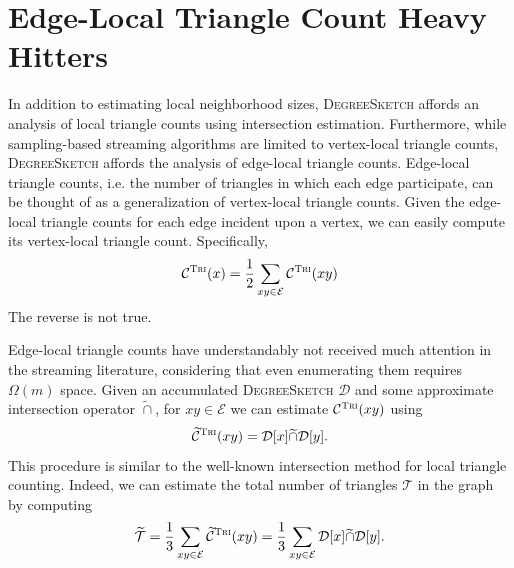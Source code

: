 \documentclass[10]{article}
\newcommand{\algoname}[1]{\textnormal{\textsc{#1}}}
\begin{document}
\section{Edge-Local Triangle Count Heavy Hitters}
 \label{DS:sec:edge_triangles}

In addition to estimating local neighborhood sizes, \algoname{DegreeSketch} affords an analysis of local triangle counts using intersection estimation. 
Furthermore, while sampling-based streaming algorithms are limited to vertex-local triangle counts, \algoname{DegreeSketch} affords the analysis of edge-local triangle counts. 
Edge-local triangle counts, i.e. the number of triangles in which each edge participate, can be thought of as a generalization of vertex-local triangle counts. 
Given the edge-local triangle counts for each edge incident upon a vertex, we can easily compute its vertex-local triangle count.
Specifically,
%
\begin{equation} \label{eq:sum_of_edge_tris}
	\mathcal{C}^\algoname{Tri}(x) 
	= \frac{1}{2}\sum\limits_{xy \in \mathcal{E}} \mathcal{C}^\algoname{Tri}(xy)
\end{equation}
%
The reverse is not true. 

Edge-local triangle counts have understandably not received much attention in the streaming literature, considering that even enumerating them requires $\Omega(m)$ space. 
Given an accumulated \algoname{DegreeSketch} $\mathcal{D}$ and some approximate intersection operator $\widetilde{\cap}$, for $xy \in \mathcal{E}$ we can estimate $\mathcal{C}^{\algoname{Tri}}(xy)$ using 
%
\begin{equation} \label{eq:tri:edge}
	\widetilde{\mathcal{C}}^{\algoname{Tri}}(xy) 
	= \mathcal{D}[x] \widetilde{\cap} \mathcal{D}[y].
\end{equation}
%
This procedure is similar to the well-known intersection method for local triangle counting. 
Indeed, we can estimate the total number of triangles $\mathcal{T}$ in the graph by computing
%
\begin{equation} \label{eq:tri:total}
	\widetilde{\mathcal{T}} 
	= \frac{1}{3} \sum\limits_{xy \in \mathcal{E}} 	\widetilde{\mathcal{C}}^{\algoname{Tri}}(xy) 
	= \frac{1}{3} \sum\limits_{xy \in \mathcal{E}} \mathcal{D}[x] \widetilde{\cap} \mathcal{D}[y].
\end{equation}
%
\end{document}
